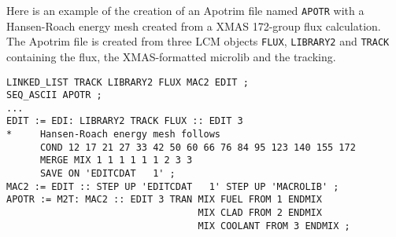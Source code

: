 Here is an example of the creation of an Apotrim file named {\tt APOTR} with a Hansen-Roach energy mesh created
from a XMAS 172-group flux calculation. The Apotrim file is created from three
LCM objects {\tt FLUX}, {\tt LIBRARY2} and {\tt TRACK} containing the flux, the XMAS-formatted microlib
and the tracking.

\begin{verbatim}
LINKED_LIST TRACK LIBRARY2 FLUX MAC2 EDIT ;
SEQ_ASCII APOTR ;
...
EDIT := EDI: LIBRARY2 TRACK FLUX :: EDIT 3
*     Hansen-Roach energy mesh follows
      COND 12 17 21 27 33 42 50 60 66 76 84 95 123 140 155 172
      MERGE MIX 1 1 1 1 1 1 2 3 3
      SAVE ON 'EDITCDAT   1' ;
MAC2 := EDIT :: STEP UP 'EDITCDAT   1' STEP UP 'MACROLIB' ;
APOTR := M2T: MAC2 :: EDIT 3 TRAN MIX FUEL FROM 1 ENDMIX
                                  MIX CLAD FROM 2 ENDMIX
                                  MIX COOLANT FROM 3 ENDMIX ;
\end{verbatim}
\eject
